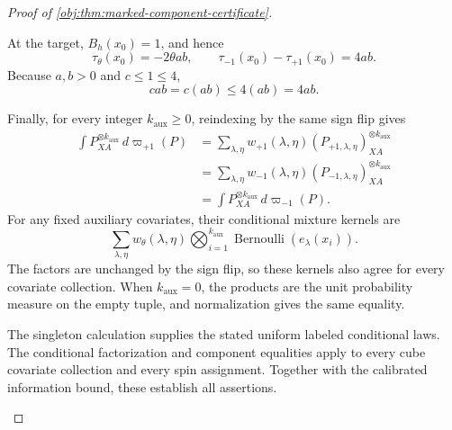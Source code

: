 \begin{proof}[Proof of \cref{obj:thm:marked-component-certificate}]
\begin{enumerate}
At the target, \(B_h(x_0)=1\), and hence
\[
\tau_\theta(x_0)=-2\theta ab,
\qquad
\tau_{-1}(x_0)-\tau_{+1}(x_0)=4ab.
\]
Because \(a,b>0\) and \(c\le1\le4\),
\[
cab=c(ab)\le4(ab)=4ab.
\]

Finally, for every integer \(k_{\mathrm{aux}}\ge0\), reindexing by the same sign flip gives
\[
\begin{aligned}
\int P_{XA}^{\otimes k_{\mathrm{aux}}}\,d\varpi_{+1}(P)
&=
\sum_{\lambda,\eta}
w_{+1}(\lambda,\eta)
(P_{+1,\lambda,\eta})_{XA}^{\otimes k_{\mathrm{aux}}}\\
&=
\sum_{\lambda,\eta}
w_{-1}(\lambda,\eta)
(P_{-1,\lambda,\eta})_{XA}^{\otimes k_{\mathrm{aux}}}\\
&=
\int P_{XA}^{\otimes k_{\mathrm{aux}}}\,d\varpi_{-1}(P).
\end{aligned}
\]
For any fixed auxiliary covariates, their conditional mixture kernels are
\[
\sum_{\lambda,\eta}
w_\theta(\lambda,\eta)
\bigotimes_{i=1}^{k_{\mathrm{aux}}}
\operatorname{Bernoulli}(e_\lambda(x_i)).
\]
The factors are unchanged by the sign flip, so these kernels also agree for every covariate collection. When \(k_{\mathrm{aux}}=0\), the products are the unit probability measure on the empty tuple, and normalization gives the same equality.

The singleton calculation supplies the stated uniform labeled conditional laws. The conditional factorization and component equalities apply to every cube covariate collection and every spin assignment. Together with the calibrated information bound, these establish all assertions.
\end{enumerate}
\end{proof}

